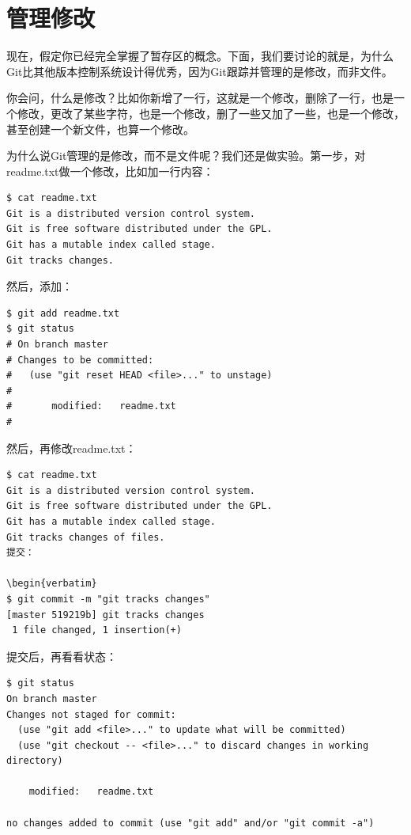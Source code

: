 \section{管理修改}
现在，假定你已经完全掌握了暂存区的概念。下面，我们要讨论的就是，为什么Git比其他版本控制系统设计得优秀，因为Git跟踪并管理的是修改，而非文件。

你会问，什么是修改？比如你新增了一行，这就是一个修改，删除了一行，也是一个修改，更改了某些字符，也是一个修改，删了一些又加了一些，也是一个修改，甚至创建一个新文件，也算一个修改。

为什么说Git管理的是修改，而不是文件呢？我们还是做实验。第一步，对readme.txt做一个修改，比如加一行内容：

\begin{verbatim}
$ cat readme.txt
Git is a distributed version control system.
Git is free software distributed under the GPL.
Git has a mutable index called stage.
Git tracks changes.
\end{verbatim}

然后，添加：

\begin{verbatim}
$ git add readme.txt
$ git status
# On branch master
# Changes to be committed:
#   (use "git reset HEAD <file>..." to unstage)
#
#       modified:   readme.txt
#
\end{verbatim}

然后，再修改readme.txt：

\begin{verbatim}
$ cat readme.txt 
Git is a distributed version control system.
Git is free software distributed under the GPL.
Git has a mutable index called stage.
Git tracks changes of files.
提交：

\begin{verbatim}
$ git commit -m "git tracks changes"
[master 519219b] git tracks changes
 1 file changed, 1 insertion(+)
\end{verbatim}

提交后，再看看状态：

\begin{verbatim}
$ git status
On branch master
Changes not staged for commit:
  (use "git add <file>..." to update what will be committed)
  (use "git checkout -- <file>..." to discard changes in working directory)

	modified:   readme.txt

no changes added to commit (use "git add" and/or "git commit -a")
\end{verbatim}

